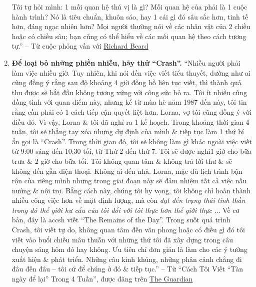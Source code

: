 \documentclass[oneside]{book}
\numberwithin{equation}{section}
\begin{document}
\begin{enumerate}
	Tôi tự hỏi mình: 1 mối quan hệ thú vị là gì? Mối quan hệ của phải là 1 cuộc hành trình? Nó là tiêu chuẩn, khuôn sáo, hay 1 cái gì đó sâu sắc hơn, tinh tế hơn, đáng ngạc nhiên hơn? Mọi người thường nói về các nhân vật của 2 chiều hoặc có chiều sâu; bạn cũng có thể hiểu về các mối quan hệ theo cách tương tự.'' -- Từ cuộc phỏng vấn với \href{https://holdenlee.wordpress.com/2014/02/18/kazuo-ishiguro-on-writing/}{Richard Beard}
	\item \textbf{Để loại bỏ những phiền nhiễu, hãy thử ``Crash''.} ``Nhiều người phải làm việc nhiều giờ. Tuy nhiên, khi nói đến việc viết tiểu thuyết, dường như ai cũng đồng ý rằng sau độ khoảng 4 giờ đồng hồ liên tục viết, thì thành quả thu được sẽ bắt đầu không tương xứng với công sức bỏ ra. Tôi ít nhiều cũng đồng tình với quan điểm này, nhưng kể từ mùa hè năm 1987 đến này, tôi tin rằng cần phải có 1 cách tiếp cận quyết liệt hơn. Lorna, vợ tôi cũng đồng ý với điều đó. Vì vậy, Lorna \& tôi đã nghỉ ra 1 kế hoạch. Trong khoảng thời gian 4 tuần, tôi sẽ thẳng tay xóa những dự định của mình \& tiếp tục làm 1 thứ bí ẩn gọi là ``Crash''. Trong thời gian đó, tôi sẽ không làm gì khác ngoài việc viết từ 9:00 sáng đến 10:30 tối, từ Thứ 2 đến thứ 7. Tôi sẽ được nghỉ1 giờ cho bữa trưa \& 2 giờ cho bữa tối. Tôi không quan tâm \& không trả lời thư \& sẽ không đến gần điện thoại. Không ai đến nhà. Lorna, mặc dù lịch trình bận rộn của riêng mình nhưng trong giai đoạn này sẽ đảm nhiệm tất cả việc nấu nướng \& nội trợ. Bằng cách này, chúng tôi hy vọng, tôi không chỉ hoàn thành nhiều công việc hơn về mặt định lượng, mà còn \textit{đạt đến trạng thái tinh thần trong đó thế giới hư cấu của tôi đối với tôi thực hơn thế giới thực} $\ldots$ Về cơ bản, đây là accsh viết ``The Remains of the Day''. Trong suốt quá trình Crash, tôi viết tự do, không quan tâm đến văn phong hoặc có điều gì đó tôi viết vào buổi chiều mâu thuẫn với những thứ tôi đã xây dựng trong câu chuyện sáng hôm đó hay không. Ưu tiên chỉ đơn giản là làm cho các ý tưởng xuất hiện \& phát triển. Những câu kinh khủng, những phân cảnh chẳng đi đâu đến đâu -- tôi cứ để chúng ở đó \& tiếp tục.'' -- Từ ``Cách Tôi Viết ``Tàn ngày để lại'' Trong 4 Tuần'', được đăng trên \href{https://www.theguardian.com/books/2014/dec/06/kazuo-ishiguro-the-remains-of-the-day-guardian-book-club}{The Guardian}

\end{enumerate}
\end{document}
